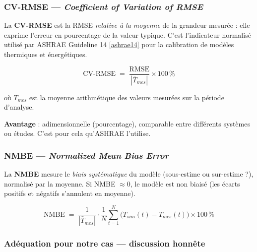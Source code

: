 \documentclass[11pt,a4paper]{article}
\begin{document}
\subsubsection*{CV-RMSE — \emph{Coefficient of Variation of RMSE}}

\begin{principe}
La \textbf{CV-RMSE} est la RMSE \emph{relative à la moyenne} de la grandeur mesurée :
elle exprime l'erreur en pourcentage de la valeur typique. C'est l'indicateur normalisé
utilisé par ASHRAE Guideline 14 \ref{ashrae14} pour la calibration de modèles thermiques
et énergétiques.
\end{principe}

\begin{equation}
\boxed{\;\mathrm{CV\text{-}RMSE} \;=\; \frac{\mathrm{RMSE}}{|\bar T_{mes}|} \times 100\,\%\;}
\end{equation}

où $\bar T_{mes}$ est la moyenne arithmétique des valeurs mesurées sur la période
d'analyse.

\textbf{Avantage} : adimensionnelle (pourcentage), comparable entre différents systèmes
ou études. C'est pour cela qu'ASHRAE l'utilise.

\subsubsection*{NMBE — \emph{Normalized Mean Bias Error}}

\begin{principe}
La \textbf{NMBE} mesure le \emph{biais systématique} du modèle (sous-estime ou
sur-estime ?), normalisé par la moyenne. Si NMBE $\approx 0$, le modèle est non biaisé
(les écarts positifs et négatifs s'annulent en moyenne).
\end{principe}

\begin{equation}
\boxed{\;\mathrm{NMBE} \;=\; \frac{1}{|\bar T_{mes}|} \cdot \frac{1}{N}\sum_{t=1}^{N}\big(T_{sim}(t) - T_{mes}(t)\big) \times 100\,\%\;}
\end{equation}

\subsubsection*{Adéquation pour notre cas — discussion honnête}
\end{document}
